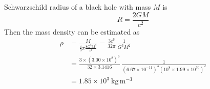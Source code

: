 Schwarzschild radius of a black hole with mass $M$ is
\[
R = \frac{2GM}{c^2} \tag*{(4 points)}
\]
Then the mass density can be estimated as
\begin{align*}
\rho &= \frac{M}{\frac{4}{3}\pi \frac{8G^3M^3}{c^6}}
      = \frac{3c^6}{32\pi}\,\frac{1}{G^3M^2} \tag*{(2 points)}\\
     &= \frac{3 \times (3.00 \times 10^{8})^6}{32 \times 3.1416}\,
        \frac{1}{(6.67 \times 10^{-11})^3 (10^{8} \times 1.99 \times 10^{30})^2}\\
     &= 1.85 \times 10^{3}~\mathrm{kg\,m^{-3}} \tag*{(4 points)}
\end{align*}
